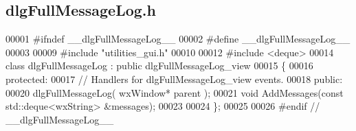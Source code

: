 \subsection{dlg\+Full\+Message\+Log.\+h}
\label{dlgFullMessageLog_8h_source}

\begin{DoxyCode}
00001 \textcolor{preprocessor}{#ifndef \_\_dlgFullMessageLog\_\_}
00002 \textcolor{preprocessor}{#define \_\_dlgFullMessageLog\_\_}
00003 
00009 \textcolor{preprocessor}{#include "utilities_gui.h"}
00010 
00012 \textcolor{preprocessor}{#include <deque>}
00014 \textcolor{keyword}{class }dlgFullMessageLog : \textcolor{keyword}{public} dlgFullMessageLog_view
00015 \{
00016     \textcolor{keyword}{protected}:
00017         \textcolor{comment}{// Handlers for dlgFullMessageLog\_view events.}
00018     \textcolor{keyword}{public}:
00020         dlgFullMessageLog( wxWindow* parent );
00021         \textcolor{keywordtype}{void} AddMessages(\textcolor{keyword}{const} std::deque<wxString> &messages);
00023     
00024 \};
00025 
00026 \textcolor{preprocessor}{#endif // \_\_dlgFullMessageLog\_\_}
\end{DoxyCode}
